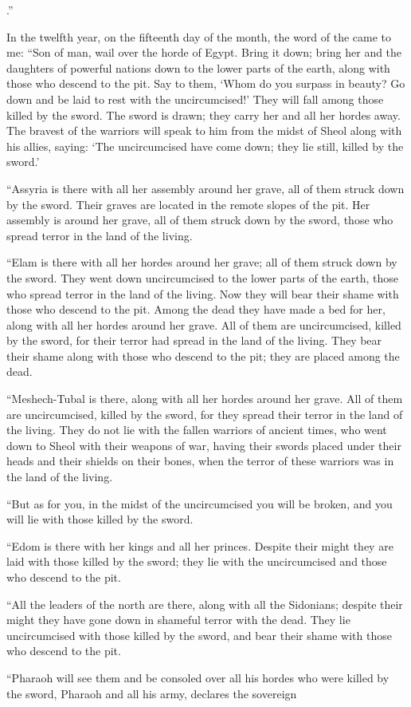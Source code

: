 {{}.”
\par }{\PP {}In the twelfth
year,
on the fifteenth
day of the month,
the word
of the {}
came to me:
“Son
of man,
wail
over
the horde
of Egypt.
Bring it down;
bring her and the daughters
of powerful
nations
down to
the lower
parts of the earth,
along with
those who descend
to the pit.
Say to them, ‘Whom
do you surpass
in beauty? Go down
and be laid
to rest with
the uncircumcised!’
They will fall
among
those killed
by
the sword.
The sword
is drawn;
they carry her and all
her hordes away.
The bravest
of the warriors
will speak
to him from the midst
of Sheol
along with
his allies,
saying: ‘The uncircumcised
have come down;
they lie
still, killed
by the sword.’
\par }{\PP {}“Assyria
is there
with all
her assembly
around
her grave,
all
of them struck
down
by the sword.
Their graves
are located in the remote
slopes of the pit.
Her assembly
is around
her grave,
all
of them struck
down
by the sword,
those who
spread
terror
in the land
of the living.
\par }{\PP {}“Elam
is there
with all
her hordes
around
her grave;
all
of them struck
down
by the sword.
They went down
uncircumcised
to
the lower
parts of the earth,
those who
spread
terror
in the land
of the living.
Now they will bear
their shame
with
those who descend
to the pit.
Among
the dead
they have made
a bed
for her, along with all
her hordes
around
her grave.
All
of them are uncircumcised,
killed
by the sword,
for
their terror
had spread in the land
of the living.
They bear
their shame
along with
those who descend
to the pit;
they are placed
among
the dead.
\par }{\PP {}“Meshech-Tubal
is there,
along with all
her hordes
around
her grave.
All
of them are uncircumcised,
killed
by the sword,
for
they spread
their terror
in the land
of the living.
They do not
lie
with
the fallen
warriors
of ancient times,
who
went down
to Sheol
with their weapons
of war,
having their swords
placed
under
their heads
and their shields
on
their bones,
when
the terror
of these warriors
was in the land
of the living.
\par }{\PP {}“But as for you,
in the midst
of the uncircumcised
you will be broken,
and you will lie
with
those killed
by the sword.
\par }{\PP {}“Edom
is there
with
her kings
and all
her princes.
Despite
their might
they are laid with
those killed
by the sword;
they
lie
with
the uncircumcised
and those who descend
to the pit.
\par }{\PP {}“All
the leaders
of the north
are there,
along with all
the Sidonians;
despite their might
they have
gone down
in shameful
terror
with
the dead.
They lie
uncircumcised
with
those killed
by the sword,
and bear
their shame
with
those who descend
to the pit.
\par }{\PP {}“Pharaoh
will see
them and be consoled
over
all
his hordes
who were killed
by the sword,
Pharaoh
and all
his army,
declares
the sovereign

}
